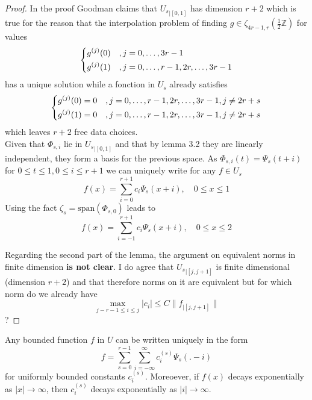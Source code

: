 \documentclass[a4paper, 11pt]{article}
\begin{document}
\begin{proof}
  In the proof Goodman claims that ${U_s}_{|[0,1]}$ has dimension $r+2$ which is true for the reason that the 
  interpolation problem of finding $g \in \zeta_{4r-1, r}(\frac{1}{2}\mathbb{Z})$ for values
  \begin{equation*}
    \begin{dcases}
      g^{(j)}(0) &, j=0, \ldots, 3r-1 \\
      g^{(j)}(1) &, j=0, \ldots, r-1, 2r, \ldots, 3r-1
    \end{dcases}
  \end{equation*}
  has a unique solution while a fonction in $U_s$ already satisfies
  \begin{equation*}
    \begin{dcases}
      g^{(j)}(0)=0 &, j=0, \ldots, r-1, 2r, \ldots, 3r-1, j \neq 2r+s \\
      g^{(j)}(1)=0 &, j=0, \ldots, r-1, 2r, \ldots, 3r-1, j\neq 2r+s
    \end{dcases}
  \end{equation*}
  which leaves $r+2$ free data choices. \\
  Given that $\Phi_{s,i}$ lie in ${U_s}_{|[0,1]}$ and that by lemma 3.2 they are linearly independent, they form a basis 
  for the previous space. As $\Phi_{s,i}(t) = \Psi_s(t+i)$ for $0 \leq t \leq 1, 0 \leq i \leq r+1$ we can uniquely 
  write for any $f \in U_s$
  \begin{equation*}
    f(x) = \sum_{i=0}^{r+1} c_i \Psi_s(x+i), \quad 0 \leq x \leq 1 
  \end{equation*}
  Using the fact $\zeta_s = \text{span}(\Phi_{s,0})$ leads to
    \begin{equation*}
      f(x) = \sum_{i=-1}^{r+1} c_i \Psi_s(x+i), \quad 0 \leq x \leq 2
    \end{equation*}

    Regarding the second part of the lemma, the argument on equivalent norms in finite dimension \textbf{is not clear}. 
    I do agree that ${U_s}_{|[j, j+1]}$ is finite dimensional (dimension $r+2$) and that therefore norms on it are 
    equivalent but for which norm do we already have 
    \begin{equation*}
      \max_{j-r-1\leq i \leq j} |c_i| \leq C \|f_{|[j,j+1]} \|
    \end{equation*}?
\end{proof}

\begin{thm}{3.1}
  Any bounded function $f$ in $U$ can be written uniquely in the form
  \begin{equation}
    f  = \sum_{s=0}^{r-1} \sum_{i=-\infty}^{\infty} c_i^{(s)} \Psi_s(.-i)
  \end{equation}
  for uniformly bounded constants $c_i^{(s)}$. Moreoever, if $f(x)$ decays exponentially as $|x| \to \infty$, then 
  $c_i^{(s)}$ decays exponentially as $|i| \to \infty$.
\end{thm}
\end{document}
